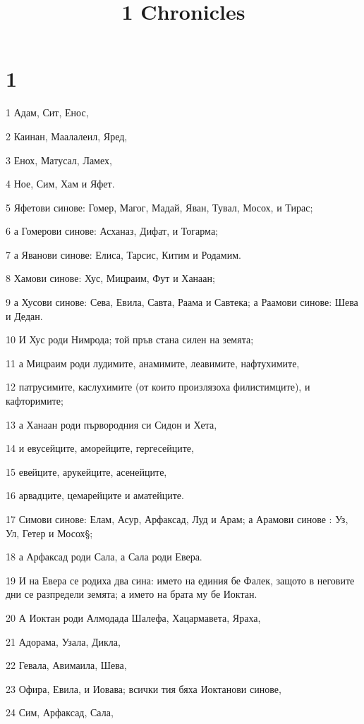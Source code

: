 

\title{1 Chronicles}


\chapter{1}

\par 1 Адам, Сит, Енос,
\par 2 Каинан, Маалалеил, Яред,
\par 3 Енох, Матусал, Ламех,
\par 4 Ное, Сим, Хам и Яфет.
\par 5 Яфетови синове: Гомер, Магог, Мадай, Яван, Тувал, Мосох, и Тирас;
\par 6 а Гомерови синове: Асханаз, Дифат, и Тогарма;
\par 7 а Яванови синове: Елиса, Тарсис, Китим и Родамим.
\par 8 Хамови синове: Хус, Мицраим, Фут и Ханаан;
\par 9 а Хусови синове: Сева, Евила, Савта, Раама и Савтека; а Раамови синове: Шева и Дедан.
\par 10 И Хус роди Нимрода; той пръв стана силен на земята;
\par 11 а Мицраим роди лудимите, анамимите, леавимите, нафтухимите,
\par 12 патрусимите, каслухимите (от които произлязоха филистимците), и кафторимите;
\par 13 а Ханаан роди първородния си Сидон и Хета,
\par 14 и евусейците, аморейците, гергесейците,
\par 15 евейците, арукейците, асенейците,
\par 16 арвадците, цемарейците и аматейците.
\par 17 Симови синове: Елам, Асур, Арфаксад, Луд и Арам; а Арамови синове : Уз, Ул, Гетер и Мосох§;
\par 18 а Арфаксад роди Сала, а Сала роди Евера.
\par 19 И на Евера се родиха два сина: името на единия бе Фалек, защото в неговите дни се разпредели земята; а името на брата му бе Иоктан.
\par 20 А Иоктан роди Алмодада Шалефа, Хацармавета, Яраха,
\par 21 Адорама, Узала, Дикла,
\par 22 Гевала, Авимаила, Шева,
\par 23 Офира, Евила, и Иовава; всички тия бяха Иоктанови синове,
\par 24 Сим, Арфаксад, Сала,

